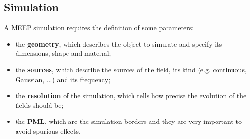 \subsection{Simulation}

A MEEP simulation requires the definition of some parameters:
\begin{itemize}
    \item the \textbf{geometry}, which describes the object to simulate and specify its dimensions, shape and material;
    \item the \textbf{sources}, which describe the sources of the field, its kind (e.g. continuous, Gaussian, ...) and its frequency;
    \item the \textbf{resolution} of the simulation, which tells how precise the evolution of the fields should be;
    \item the \textbf{PML}, which are the simulation borders and they are very important to avoid spurious effects.
\end{itemize}